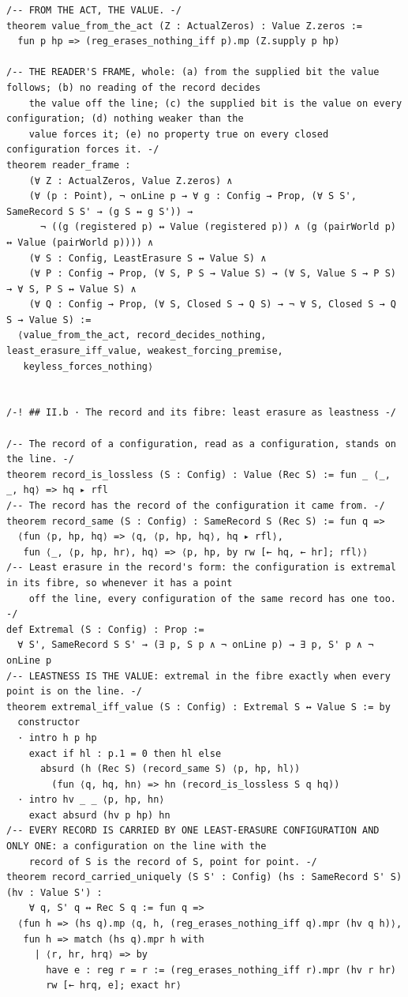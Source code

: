 \documentclass[10pt,twocolumn]{article}
\begin{document}
\begin{Verbatim}
/-- FROM THE ACT, THE VALUE. -/
theorem value_from_the_act (Z : ActualZeros) : Value Z.zeros :=
  fun p hp => (reg_erases_nothing_iff p).mp (Z.supply p hp)

/-- THE READER'S FRAME, whole: (a) from the supplied bit the value follows; (b) no reading of the record decides
    the value off the line; (c) the supplied bit is the value on every configuration; (d) nothing weaker than the
    value forces it; (e) no property true on every closed configuration forces it. -/
theorem reader_frame :
    (∀ Z : ActualZeros, Value Z.zeros) ∧
    (∀ (p : Point), ¬ onLine p → ∀ g : Config → Prop, (∀ S S', SameRecord S S' → (g S ↔ g S')) →
      ¬ ((g (registered p) ↔ Value (registered p)) ∧ (g (pairWorld p) ↔ Value (pairWorld p)))) ∧
    (∀ S : Config, LeastErasure S ↔ Value S) ∧
    (∀ P : Config → Prop, (∀ S, P S → Value S) → (∀ S, Value S → P S) → ∀ S, P S ↔ Value S) ∧
    (∀ Q : Config → Prop, (∀ S, Closed S → Q S) → ¬ ∀ S, Closed S → Q S → Value S) :=
  ⟨value_from_the_act, record_decides_nothing, least_erasure_iff_value, weakest_forcing_premise,
   keyless_forces_nothing⟩


/-! ## II.b · The record and its fibre: least erasure as leastness -/

/-- The record of a configuration, read as a configuration, stands on the line. -/
theorem record_is_lossless (S : Config) : Value (Rec S) := fun _ ⟨_, _, hq⟩ => hq ▸ rfl
/-- The record has the record of the configuration it came from. -/
theorem record_same (S : Config) : SameRecord S (Rec S) := fun q =>
  ⟨fun ⟨p, hp, hq⟩ => ⟨q, ⟨p, hp, hq⟩, hq ▸ rfl⟩,
   fun ⟨_, ⟨p, hp, hr⟩, hq⟩ => ⟨p, hp, by rw [← hq, ← hr]; rfl⟩⟩
/-- Least erasure in the record's form: the configuration is extremal in its fibre, so whenever it has a point
    off the line, every configuration of the same record has one too. -/
def Extremal (S : Config) : Prop :=
  ∀ S', SameRecord S S' → (∃ p, S p ∧ ¬ onLine p) → ∃ p, S' p ∧ ¬ onLine p
/-- LEASTNESS IS THE VALUE: extremal in the fibre exactly when every point is on the line. -/
theorem extremal_iff_value (S : Config) : Extremal S ↔ Value S := by
  constructor
  · intro h p hp
    exact if hl : p.1 = 0 then hl else
      absurd (h (Rec S) (record_same S) ⟨p, hp, hl⟩)
        (fun ⟨q, hq, hn⟩ => hn (record_is_lossless S q hq))
  · intro hv _ _ ⟨p, hp, hn⟩
    exact absurd (hv p hp) hn
/-- EVERY RECORD IS CARRIED BY ONE LEAST-ERASURE CONFIGURATION AND ONLY ONE: a configuration on the line with the
    record of S is the record of S, point for point. -/
theorem record_carried_uniquely (S S' : Config) (hs : SameRecord S' S) (hv : Value S') :
    ∀ q, S' q ↔ Rec S q := fun q =>
  ⟨fun h => (hs q).mp ⟨q, h, (reg_erases_nothing_iff q).mpr (hv q h)⟩,
   fun h => match (hs q).mpr h with
     | ⟨r, hr, hrq⟩ => by
       have e : reg r = r := (reg_erases_nothing_iff r).mpr (hv r hr)
       rw [← hrq, e]; exact hr⟩


\end{Verbatim}
\end{document}
